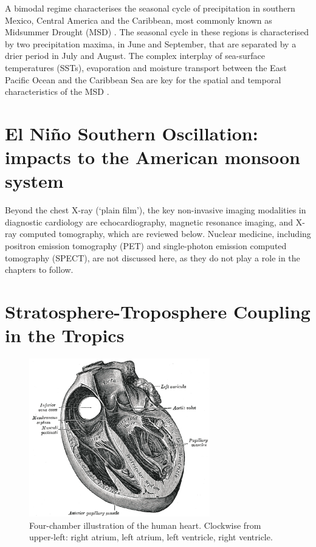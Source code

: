A bimodal regime characterises the seasonal cycle of precipitation in southern Mexico, Central America and the Caribbean, most commonly known as Midsummer Drought (MSD) \citep{magana1999,gamble2008} \citep{dilley1996,amador2016,duranquesada2017}.
The seasonal cycle in these regions is characterised by two precipitation maxima, in June and September, that are separated by a drier period in July and August.
The complex interplay of sea-surface temperatures (SSTs), evaporation and moisture transport between the East Pacific Ocean and the Caribbean Sea are key for the spatial and temporal characteristics of the MSD \citep{amador2006,herrera2015,duranquesada2017,straffon2019}.

\section{El Niño Southern Oscillation: impacts to the American monsoon system}
\label{sub:diagnostic}

Beyond the chest X-ray (`plain film'), the key non-invasive imaging modalities in diagnostic cardiology are echocardiography, magnetic resonance imaging, and X-ray computed tomography, which are reviewed below.  Nuclear medicine, including positron emission tomography (PET) and single-photon emission computed tomography (SPECT), are not discussed here, as they do not play a role in the chapters to follow.

\section{Stratosphere-Troposphere Coupling in the Tropics}

\begin{figure}
\centering\includegraphics[width=0.7\textwidth]{figures/sample/Gray498.png} 
\caption[Four-chamber illustration of the human heart.]{Four-chamber illustration of the human heart.  Clockwise from upper-left: right atrium, left atrium, left ventricle, right ventricle.}
\label{fig:fourchamber}\end{figure}

